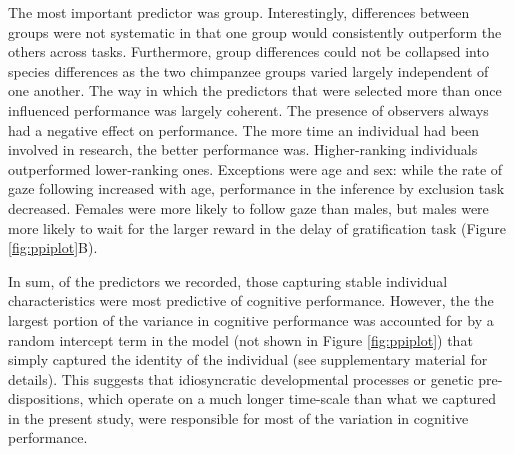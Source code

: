 \documentclass[
  man,floatsintext]{apa6}
\begin{document}
The most important predictor was group. Interestingly, differences between groups were not systematic in that one group would consistently outperform the others across tasks. Furthermore, group differences could not be collapsed into species differences as the two chimpanzee groups varied largely independent of one another. The way in which the predictors that were selected more than once influenced performance was largely coherent. The presence of observers always had a negative effect on performance. The more time an individual had been involved in research, the better performance was. Higher-ranking individuals outperformed lower-ranking ones. Exceptions were age and sex: while the rate of gaze following increased with age, performance in the inference by exclusion task decreased. Females were more likely to follow gaze than males, but males were more likely to wait for the larger reward in the delay of gratification task (Figure \ref{fig:ppiplot}B).

In sum, of the predictors we recorded, those capturing stable individual characteristics were most predictive of cognitive performance. However, the the largest portion of the variance in cognitive performance was accounted for by a random intercept term in the model (not shown in Figure \ref{fig:ppiplot}) that simply captured the identity of the individual (see supplementary material for details). This suggests that idiosyncratic developmental processes or genetic pre-dispositions, which operate on a much longer time-scale than what we captured in the present study, were responsible for most of the variation in cognitive performance.
\end{document}
